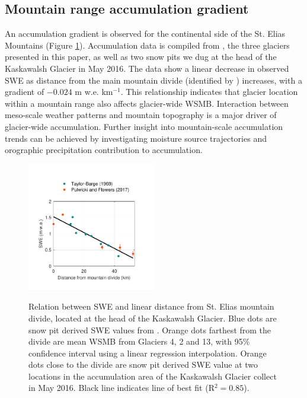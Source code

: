 \documentclass[twocolumn,letterpaper]{igs}
\begin{document}
\subsection{Mountain range accumulation gradient}

An accumulation gradient is observed for the continental side of the St. Elias Mountains (Figure \ref{fig:AccumGrad}). Accumulation data is compiled from \cite{Taylor1969}, the three glaciers presented in this paper, as well as two snow pits we dug at the head of the Kaskawalsh Glacier in May 2016. The data show a linear decrease in observed SWE as distance from the main mountain divide (identified by \cite{Taylor1969}) increases, with a gradient of $-0.024$ m w.e. km$^{-1}$. This relationship indicates that glacier location within a mountain range also affects glacier-wide WSMB. Interaction between meso-scale weather patterns and mountain topography is a major driver of glacier-wide accumulation. Further insight into mountain-scale accumulation trends can be achieved by investigating moisture source trajectories and orographic precipitation contribution to accumulation. 

\begin{figure}
	\centering
	\includegraphics[width =0.5\textwidth]{AccumGrad.pdf}\\
	\caption{Relation between SWE and linear distance from St. Elias mountain divide, located at the head of the Kaskawalsh Glacier. Blue dots are snow pit derived SWE values from \citep{Taylor1969}. Orange dots farthest from the divide are mean WSMB from Glaciers 4, 2 and 13, with 95\% confidence interval using a linear regression interpolation. Orange dots close to the divide are snow pit derived SWE value at two locations in the accumulation area of the Kaskawalsh Glacier collect in May 2016. Black line indicates line of best fit (R$^2=0.85$).}
	\label{fig:AccumGrad}
\end{figure}
\end{document}
